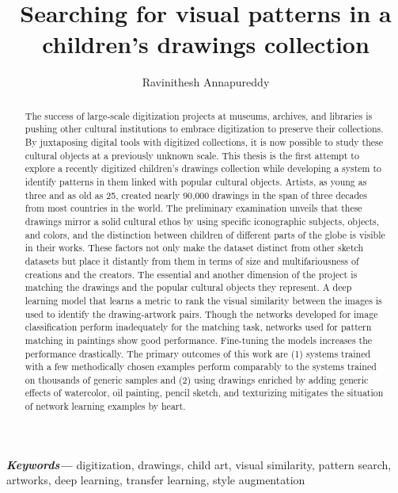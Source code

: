 \documentclass[a4paper,11pt,oneside]{report}
\title{Searching for visual patterns in a children's drawings collection}
\author{Ravinithesh Annapureddy}
\providecommand{\keywords}[1]{\textbf{\textit{Keywords---}} #1}
\begin{document}
\maketitle
\makededication

\makeacks

\begin{abstract}

The success of large-scale digitization projects at museums, archives, and libraries is pushing other cultural institutions to embrace digitization to preserve their collections. By juxtaposing digital tools with digitized collections, it is now possible to study these cultural objects at a previously unknown scale. This thesis is the first attempt to explore a recently digitized children's drawings collection while developing a system to identify patterns in them linked with popular cultural objects. Artists, as young as three and as old as 25, created nearly 90,000 drawings in the span of three decades from most countries in the world. The preliminary examination unveils that these drawings mirror a solid cultural ethos by using specific iconographic subjects, objects, and colors, and the distinction between children of different parts of the globe is visible in their works. These factors not only make the dataset distinct from other sketch datasets but place it distantly from them in terms of size and multifariousness of creations and the creators. The essential and another dimension of the project is matching the drawings and the popular cultural objects they represent. A deep learning model that learns a metric to rank the visual similarity between the images is used to identify the drawing-artwork pairs. Though the networks developed for image classification perform inadequately for the matching task, networks used for pattern matching in paintings show good performance. Fine-tuning the models increases the performance drastically. The primary outcomes of this work are (1) systems trained with a few methodically chosen examples perform comparably to the systems trained on thousands of generic samples and (2) using drawings enriched by adding generic effects of watercolor, oil painting, pencil sketch, and texturizing mitigates the situation of network learning examples by heart. 
\end{abstract}

\vspace{1em}

\keywords{digitization, drawings, child art, visual similarity, pattern search, artworks, deep learning, transfer learning, style augmentation}
\end{document}
